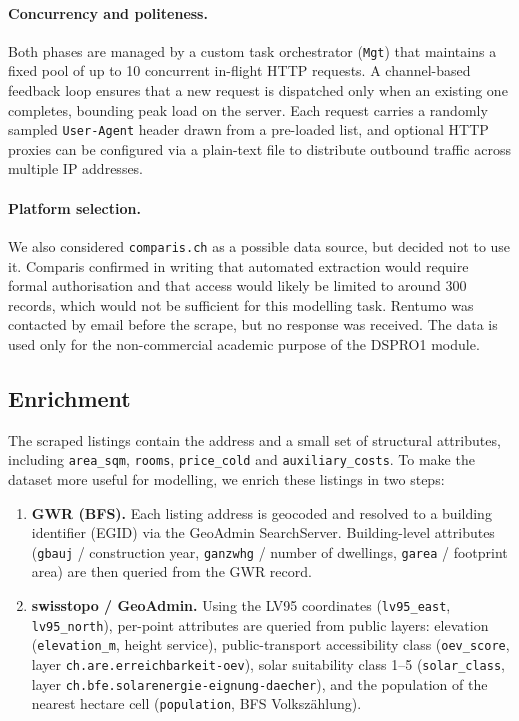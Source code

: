 \documentclass[11pt,a4paper]{article}
\begin{document}
\paragraph{Concurrency and politeness.}
Both phases are managed by a custom task orchestrator (\texttt{Mgt}) that maintains a fixed pool of up to 10 concurrent in-flight HTTP requests. A channel-based feedback loop ensures that a new request is dispatched only when an existing one completes, bounding peak load on the server. Each request carries a randomly sampled \texttt{User-Agent} header drawn from a pre-loaded list, and optional HTTP proxies can be configured via a plain-text file to distribute outbound traffic across multiple IP addresses.

\paragraph{Platform selection.}
We also considered \texttt{comparis.ch} as a possible data source, but decided not to use it. Comparis confirmed in writing that automated extraction would require formal authorisation and that access would likely be limited to around 300 records, which would not be sufficient for this modelling task. Rentumo was contacted by email before the scrape, but no response was received. The data is used only for the non-commercial academic purpose of the DSPRO1 module.

\subsection{Enrichment}
The scraped listings contain the address and a small set of structural attributes, including \texttt{area\_sqm}, \texttt{rooms}, \texttt{price\_cold} and \texttt{auxiliary\_costs}. To make the dataset more useful for modelling, we enrich these listings in two steps:

\begin{enumerate}
    \item \textbf{GWR (BFS).} Each listing address is geocoded and resolved to a building identifier (EGID) via the GeoAdmin SearchServer. Building-level attributes (\texttt{gbauj} / construction year, \texttt{ganzwhg} / number of dwellings, \texttt{garea} / footprint area) are then queried from the GWR record.
    \item \textbf{swisstopo / GeoAdmin.} Using the LV95 coordinates (\texttt{lv95\_east}, \texttt{lv95\_north}), per-point attributes are queried from public layers: elevation (\texttt{elevation\_m}, height service), public-transport accessibility class (\texttt{oev\_score}, layer \texttt{ch.are.erreichbarkeit-oev}), solar suitability class 1--5 (\texttt{solar\_class}, layer \texttt{ch.bfe.solarenergie-eignung-daecher}), and the population of the nearest hectare cell (\texttt{population}, BFS Volkszählung).
\end{enumerate}
\end{document}
